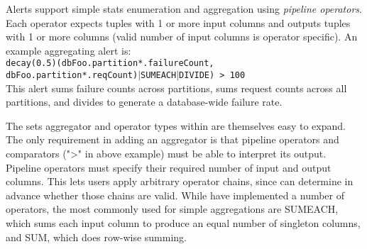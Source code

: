 Alerts support simple stats enumeration and aggregation using 
\emph{pipeline operators}.
Each operator expects tuples with 1 or more 
input columns and outputs tuples with 1 or more columns (valid number of input columns is
operator specific).  
An example aggregating alert is: \\
\texttt{decay(0.5)(dbFoo.partition*.failureCount, \\
dbFoo.partition*.reqCount)$|$SUMEACH$|$DIVIDE) > 100} \\
This alert sums failure counts across partitions, sums request counts
across all partitions, and divides to generate a
database-wide failure rate.

The sets aggregator and operator types within \helix are themselves easy to
expand.  The only requirement in adding an aggregator is that pipeline operators
and comparators (">" in above example) must be able to interpret its output.
Pipeline operators must specify their required number of input and output columns.  This
lets users apply arbitrary operator chains, since \helix can determine in
advance whether those chains are valid.  While have implemented a number of
operators, the most commonly used for simple aggregations are SUMEACH, which
sums each input column to produce an equal number of singleton columns, and SUM,
which does row-wise summing. 

